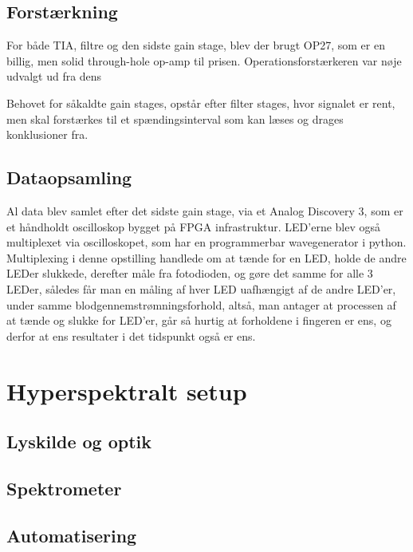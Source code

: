   \subsection{Forstærkning} 
For både TIA, filtre og den sidste gain stage, blev der brugt OP27, som er en billig, men solid through-hole op-amp til prisen. Operationsforstærkeren var nøje udvalgt ud fra dens

Behovet for såkaldte gain stages, opstår efter filter stages, hvor signalet er rent, men skal forstærkes til et spændingsinterval som kan læses og drages konklusioner fra.


  \subsection{Dataopsamling} %
Al data blev samlet efter det sidste gain stage, via et Analog Discovery 3, som er et håndholdt oscilloskop bygget på FPGA infrastruktur. LED'erne blev også multiplexet via oscilloskopet, som har en programmerbar wavegenerator i python. Multiplexing i denne opstilling handlede om at tænde for en LED, holde de andre LEDer slukkede, derefter måle fra fotodioden, og gøre det samme for alle 3 LEDer, således får man en måling af hver LED uafhængigt af de andre LED'er, under samme blodgennemstrømningsforhold, altså, man antager at processen af at tænde og slukke for LED'er, går så hurtig at forholdene i fingeren er ens, og derfor at ens resultater i det tidspunkt også er ens.


\section{Hyperspektralt setup}
  \subsection{Lyskilde og optik} %
  \subsection{Spektrometer} %
  \subsection{Automatisering} %